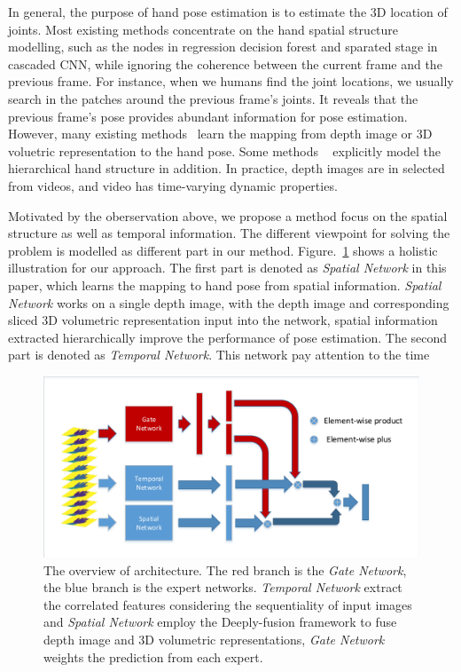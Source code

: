 \documentclass[journal,comsoc]{IEEEtran}
\let\MYoriglatexcaption\caption
\renewcommand{\caption}[2][\relax]{\MYoriglatexcaption[#2]{#2}}
\begin{document}
In general, the purpose of hand pose estimation is to estimate the 3D location of joints. Most existing
methods concentrate on the hand spatial structure modelling, such as the nodes in regression decision
forest and sparated stage in cascaded CNN, while ignoring the coherence between the current frame and
the previous frame. For instance, when we humans find the joint locations, we usually search in the
patches around the previous frame's joints. It reveals that the previous frame's pose provides abundant
information for pose estimation. However, many existing methods~\cite{oberweger2015hands, ge2017_3D} learn
the mapping from depth image or 3D voluetric representation to the hand pose. Some methods
~\cite{sun2015cascaded, ye2016spatial} explicitly model the hierarchical hand structure in addition. In
practice, depth images are in selected from videos, and video has time-varying dynamic properties.

Motivated by the oberservation above, we propose a method focus on the spatial structure as well as
temporal information. The different viewpoint for solving the problem is modelled as different part in
our method. Figure.~\ref{fig:architecture} shows a holistic illustration for our approach. The first 
part is denoted as \emph{Spatial Network} in this paper, which learns the mapping to hand pose from 
spatial information. \emph{Spatial Network} works on a single depth image, with the depth image and 
corresponding sliced 3D volumetric representation input into the network, spatial information extracted
hierarchically improve the performance of pose estimation. The second part is denoted as \emph{Temporal Network}. 
This network pay attention to the time 



\begin{figure}[t]
    \centering
    \includegraphics[width=1\linewidth]{src/network/architecture.pdf}
    \caption{The overview of architecture. The red branch is the \emph{Gate Network}, the blue
    branch is the expert networks. \emph{Temporal Network} extract the correlated features considering
    the sequentiality of input images and \emph{Spatial Network} employ the Deeply-fusion framework to
    fuse depth image and 3D volumetric representations, \emph{Gate Network} weights the prediction
    from each expert.}
\label{fig:architecture}
\end{figure}
\end{document}
